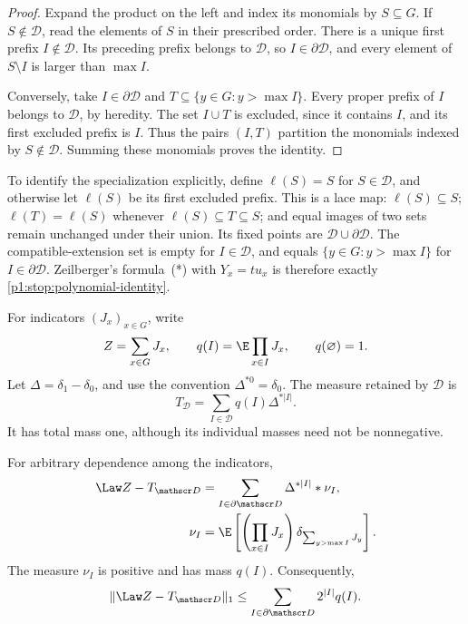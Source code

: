 \begin{proof}
Expand the product on the left and index its monomials by
$S\subseteq G$.  If $S\notin\mathscr D$, read the elements of $S$
in their prescribed order.  There is a unique first prefix
$I\notin\mathscr D$.  Its preceding prefix belongs to $\mathscr D$,
so $I\in\partial\mathscr D$, and every element of $S\setminus I$
is larger than $\max I$.

Conversely, take $I\in\partial\mathscr D$ and
$T\subseteq\{y\in G:y>\max I\}$.  Every proper prefix of $I$
belongs to $\mathscr D$, by heredity.  The set $I\cup T$ is
excluded, since it contains $I$, and its first excluded prefix is
$I$.  Thus the pairs $(I,T)$ partition the monomials indexed by
$S\notin\mathscr D$.  Summing these monomials proves the identity.
\end{proof}

To identify the specialization explicitly, define \(\ell(S)=S\)
for \(S\in\mathscr D\), and otherwise let \(\ell(S)\) be its
first excluded prefix. This is a lace map: \(\ell(S)\subseteq S\);
\(\ell(T)=\ell(S)\) whenever \(\ell(S)\subseteq T\subseteq S\);
and equal images of two sets remain unchanged under their union.
Its fixed points are \(\mathscr D\cup\partial\mathscr D\).
The compatible-extension set is empty for \(I\in\mathscr D\),
and equals \(\{y\in G:y>\max I\}\) for
\(I\in\partial\mathscr D\). Zeilberger's formula~(*) with
\(Y_x=t u_x\) is therefore exactly
\eqref{p1:stop:polynomial-identity}.

For indicators $(J_x)_{x\in G}$, write
\[
 Z=\sum_{x\in G}J_x,\qquad
 q(I)=\E\prod_{x\in I}J_x,\qquad q(\varnothing)=1.
\]
Let $\Delta=\delta_1-\delta_0$, and use the convention
$\Delta^{*0}=\delta_0$.  The measure retained by $\mathscr D$ is
\begin{equation}
 T_{\mathscr D}
       =\sum_{I\in\mathscr D}q(I)\Delta^{*|I|}.
 \label{p1:stop:retained}
\end{equation}
It has total mass one, although its individual masses need not
be nonnegative.

\begin{proposition}
\label{p1:stop:measure}
For arbitrary dependence among the indicators,
\begin{align}
 \Law Z-T_{\mathscr D}
   &=\sum_{I\in\partial\mathscr D}\Delta^{*|I|}*\nu_I,
       \label{p1:stop:measure-identity}\\
 \nu_I
   &=\E\left[
        \left(\prod_{x\in I}J_x\right)
        \delta_{\sum_{y>\max I}J_y}
        \right].
       \notag
\end{align}
The measure $\nu_I$ is positive and has mass $q(I)$.  Consequently,
\begin{equation}
 \|\Law Z-T_{\mathscr D}\|_1
       \le \sum_{I\in\partial\mathscr D}2^{|I|}q(I).
 \label{p1:stop:norm}
\end{equation}
\end{proposition}

